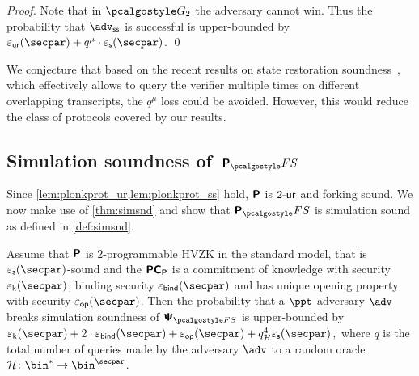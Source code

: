 \begin{proof}
	Note that in $\game{2}$ the adversary cannot win. Thus the probability
	that $\advss$ is successful is upper-bounded by
	$\epsur(\secpar) + q^{\mu} \cdot \epss(\secpar)$.  \qed
\end{proof}


We conjecture that based on the recent results on state restoration soundness~\cite{cryptoeprint:2020:1351}, which effectively allows to query the verifier multiple times on different overlapping transcripts, the $q^{\mu}$ loss could be avoided. However, this would reduce the class of protocols covered by our results. 


\subsection{Simulation soundness of~$\plonkprotfs$}
Since \cref{lem:plonkprot_ur,lem:plonkprot_ss} hold, $\bm{\mathsf{P}}$ is ${2\text{-}\mathsf{ur}}$
and forking sound. We now make use of \cref{thm:simsnd} and show that
$\plonkprot_\fs$ is simulation sound as defined in
\cref{def:simsnd}.

 \begin{corollary}
   \label{cor:simsnd}
   Assume that $\bm{\mathsf{P}}$ is $2$-programmable HVZK in the standard model, that
   is $\epss(\secpar)$-sound and the $\bm{\mathsf{PC}}_{\bm{\mathsf{P}}}$ is a commitment of knowledge with
   security $\epsk(\secpar)$, binding security $\epsbind(\secpar)$ and has unique
   opening property with security $\epsop(\secpar)$. Then the probability that a
   $\ppt$ adversary $\adv$ breaks simulation soundness of $\ps_{\fs}$ is
   upper-bounded by
   \( \epsk(\secpar) + 2\cdot\epsbind(\secpar) + \epsop(\secpar) + q_\ro^4
   \epss(\secpar)\,, \) where $q$ is the total number of queries made by the
   adversary $\adv$ to a random oracle $\ro\colon \bin^{*} \to \bin^{\secpar}$.
 \end{corollary}